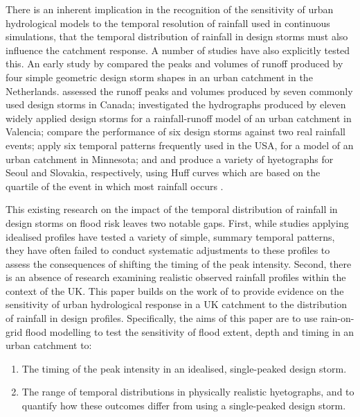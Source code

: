 \documentclass[APA,Times2COL]{WileyNJDv5}
\begin{document}
There is an inherent implication in the recognition of the sensitivity of urban hydrological models to the temporal resolution of rainfall used in continuous simulations, that the temporal distribution of rainfall in design storms must also influence the catchment response. A number of studies have also explicitly tested this. An early study by \citet{lambourne1987model} compared the peaks and volumes of runoff produced by four simple geometric design storm shapes in an urban catchment in the Netherlands. \citet{nguyen2002rainfall} assessed the runoff peaks and volumes produced by seven commonly used design storms in Canada; \citet{balbastre2019comparison} investigated the hydrographs produced by eleven widely applied design storms for a rainfall-runoff model of an urban catchment in Valencia; \citet{krvavica2020evaluation} compare the performance of six design storms against two real rainfall events; \citet{hettiarachchi2018increase} apply six temporal patterns frequently used in the USA, for a model of an urban catchment in Minnesota; and \citet{li2021case} and \citet{bezak2018impact} produce a variety of hyetographs for Seoul and Slovakia, respectively, using Huff curves which are based on the quartile of the event in which most rainfall occurs \citep{yin2016intra}.

This existing research on the impact of the temporal distribution of rainfall in design storms on flood risk leaves two notable gaps. First, while studies applying idealised profiles have tested a variety of simple, summary temporal patterns, they have often failed to conduct systematic adjustments to these profiles to assess the consequences of shifting the timing of the peak intensity. Second, there is an absence of research examining realistic observed rainfall profiles within the context of the UK. This paper builds on the work of \citet{villalobos2023towards} to provide evidence on the sensitivity of urban hydrological response in a UK catchment to the distribution of rainfall in design profiles. Specifically, the aims of this paper are to use rain-on-grid flood modelling to test the sensitivity of flood extent, depth and timing in an urban catchment to: 

\begin{enumerate}
 \item The timing of the peak intensity in an idealised, single-peaked design storm. 
 \item The range of temporal distributions in physically realistic hyetographs, and to quantify how these outcomes differ from using a single-peaked design storm. 
\end{enumerate}
\end{document}
